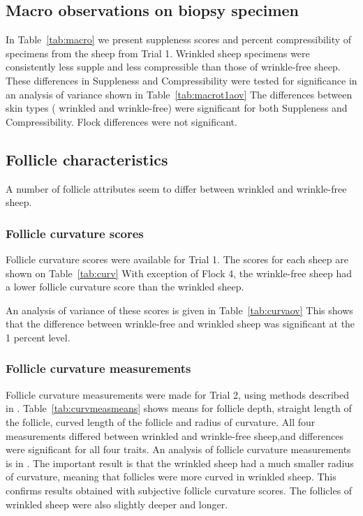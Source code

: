 \documentclass{article}
\begin{document}
\subsection{Macro observations on biopsy specimen}
In Table~\ref{tab:macro} we present suppleness scores and percent compressibility of specimens from the sheep from Trial 1.
%
Wrinkled sheep specimens were consistently less supple and less compressible than those of wrinkle-free sheep.
These differences in Suppleness and Compressibility were tested for significance in an analysis of variance shown in Table~\ref{tab:macrot1aov}
%
The differences between skin types ( wrinkled and wrinkle-free) were significant for both Suppleness and Compressibility. Flock differences were not significant.



\subsection{Follicle characteristics}
A number of follicle attributes seem to differ between wrinkled and wrinkle-free sheep. 

\subsubsection{Follicle curvature scores}
Follicle curvature scores were available for Trial 1. The scores for each sheep are shown on Table~\ref{tab:curv}
%
With exception of Flock 4, the wrinkle-free sheep had a lower follicle curvature score than the wrinkled sheep.

An analysis of variance of these scores is given in Table~\ref{tab:curvaov}
%
This shows that the difference between wrinkle-free and wrinkled sheep was significant at the 1 percent level.

\subsubsection{Follicle curvature measurements}
Follicle curvature measurements were made for Trial 2, using methods described in \cite{watts-2018}.  Table~\ref{tab:curvmeasmeans} shows means for follicle depth, straight length of the follicle, curved length of the follicle and radius of curvature. 
%
All four measurements differed between wrinkled and wrinkle-free sheep,and differences were significant for all four traits.  An analysis of follicle curvature measurements is in \cite{watts-2018}. 
The important result is that the wrinkled sheep had a much smaller radius of curvature, meaning that follicles were more curved in wrinkled sheep. This confirms results obtained with subjective follicle curvature scores.  The follicles of wrinkled sheep were also slightly deeper and longer. 
\end{document}
